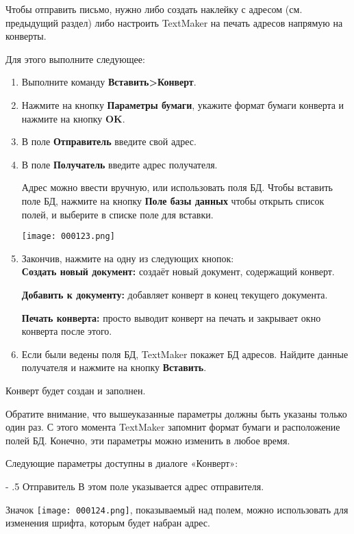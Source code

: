 ﻿\documentclass[a4paper,10pt]{article}
\makeatletter
\renewcommand\paragraph{%
   \@startsection{paragraph}{4}{0mm}%
      {-\baselineskip}%
      {.5\baselineskip}%
      {\normalfont\normalsize\bfseries}}
\makeatother
\begin{document}
Чтобы отправить письмо, нужно либо создать наклейку с адресом (см. предыдущий раздел) либо настроить TextMaker на печать адресов напрямую на конверты.

Для этого выполните следующее:

\begin{enumerate}
 \item Выполните команду \textbf{Вставить>Конверт}.
 \item Нажмите на кнопку \textbf{Параметры бумаги}, укажите формат бумаги конверта и нажмите на кнопку \textbf{OK}.
 \item В поле \textbf{Отправитель} введите свой адрес.
 \item В поле \textbf{Получатель} введите адрес получателя.
 
 Адрес можно ввести вручную, или использовать поля БД. Чтобы вставить поле БД, нажмите на кнопку \textbf{Поле базы данных} чтобы открыть список полей, и выберите в списке поле для вставки.
 
 \texttt{[image: 000123.png]}
 \item Закончив, нажмите на одну из следующих кнопок:\\
 \textbf{Создать новый документ:} создаёт новый документ, содержащий конверт.
 
 \textbf{Добавить к документу:} добавляет конверт в конец текущего документа.
 
 \textbf{Печать конверта:} просто выводит конверт на печать и закрывает окно конверта после этого.
 \item Если были ведены поля БД, TextMaker покажет БД адресов. Найдите данные получателя и нажмите на кнопку \textbf{Вставить}.
 \end{enumerate}
 
 Конверт будет создан и заполнен.
 
 Обратите внимание, что вышеуказанные параметры должны быть указаны только один раз. С этого момента TextMaker запомнит формат бумаги и расположение полей БД. Конечно, эти параметры можно изменить в любое время.
 
 Следующие параметры доступны в диалоге «Конверт»:
 
 \paragraph{Отправитель}
 В этом поле указывается адрес отправителя.
 
 Значок \texttt{[image: 000124.png]}, показываемый над полем, можно использовать для изменения шрифта, которым будет набран адрес.
 
\end{document}
